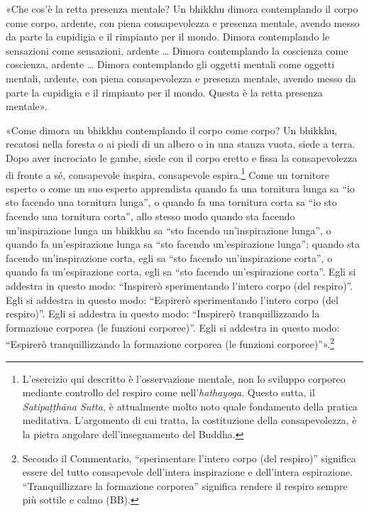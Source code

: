  «Che cos’è la retta presenza mentale? Un bhikkhu dimora
contemplando il corpo come corpo, ardente, con piena consapevolezza e presenza
mentale, avendo messo da parte la cupidigia e il rimpianto per il mondo. Dimora
contemplando le sensazioni come sensazioni, ardente … Dimora contemplando la
coscienza come coscienza, ardente … Dimora contemplando gli oggetti mentali come
oggetti mentali, ardente, con piena consapevolezza e presenza mentale, avendo
messo da parte la cupidigia e il rimpianto per il mondo. Questa è la retta
presenza mentale».


«Come dimora un bhikkhu contemplando il corpo come corpo? Un bhikkhu, recatosi
nella foresta o ai piedi di un albero o in una stanza vuota, siede a terra. Dopo
aver incrociato le gambe, siede con il corpo eretto e fissa la consapevolezza di
fronte a sé, consapevole inspira, consapevole espira.\footnote{L’esercizio qui
  descritto è l’osservazione mentale, non lo sviluppo corporeo mediante
  controllo del respiro come nell’\emph{hathayoga}. Questo sutta, il
  \emph{Satipaṭṭhāna Sutta,} è attualmente molto noto quale fondamento della
  pratica meditativa. L’argomento di cui tratta, la costituzione della
  consapevolezza, è la pietra angolare dell’insegnamento del Buddha.} Come un
tornitore esperto o come un suo esperto apprendista quando fa una tornitura
lunga sa “io sto facendo una tornitura lunga”, o quando fa una tornitura corta
sa “io sto facendo una tornitura corta”, allo stesso modo quando sta facendo
un’inspirazione lunga un bhikkhu sa “sto facendo un’inspirazione lunga”, o
quando fa un’espirazione lunga sa “sto facendo un’espirazione lunga”; quando sta
facendo un’inspirazione corta, egli sa “sto facendo un’inspirazione corta”, o
quando fa un’espirazione corta, egli sa “sto facendo un’espirazione corta”. Egli
si addestra in questo modo: “Inspirerò sperimentando l’intero corpo (del
respiro)”. Egli si addestra in questo modo: “Espirerò sperimentando l’intero
corpo (del respiro)”. Egli si addestra in questo modo: “Inspirerò
tranquillizzando la formazione corporea (le funzioni corporee)”. Egli si
addestra in questo modo: “Espirerò tranquillizzando la formazione corporea (le
funzioni corporee)”».\footnote{Secondo il Commentario, “sperimentare l’intero
  corpo (del respiro)” significa essere del tutto consapevole dell’intera
  inspirazione e dell’intera espirazione. “Tranquillizzare la formazione
  corporea” significa rendere il respiro sempre più sottile e calmo (BB).}

